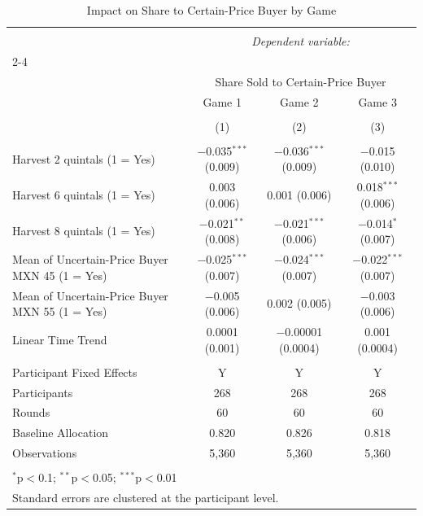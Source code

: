 
\begin{table}[!htbp] \centering 
  \caption{Impact on Share to Certain-Price Buyer by Game} 
  \label{round_level_outcomes_by_game} 
\begin{tabular}{@{\extracolsep{5pt}}lccc} 
\\[-1.8ex]\hline 
\hline \\[-1.8ex] 
 & \multicolumn{3}{c}{\textit{Dependent variable:}} \\ 
\cline{2-4} 
\\[-1.8ex] & \multicolumn{3}{c}{Share Sold to Certain-Price Buyer} \\ 
 & Game 1 & Game 2 & Game 3 \\ 
\\[-1.8ex] & (1) & (2) & (3)\\ 
\hline \\[-1.8ex] 
 Harvest 2 quintals (1 = Yes) & $-$0.035$^{***}$ (0.009) & $-$0.036$^{***}$ (0.009) & $-$0.015 (0.010) \\ 
  Harvest 6 quintals (1 = Yes) & 0.003 (0.006) & 0.001 (0.006) & 0.018$^{***}$ (0.006) \\ 
  Harvest 8 quintals (1 = Yes) & $-$0.021$^{**}$ (0.008) & $-$0.021$^{***}$ (0.006) & $-$0.014$^{*}$ (0.007) \\ 
  Mean of Uncertain-Price Buyer MXN 45 (1 = Yes) & $-$0.025$^{***}$ (0.007) & $-$0.024$^{***}$ (0.007) & $-$0.022$^{***}$ (0.007) \\ 
  Mean of Uncertain-Price Buyer MXN 55 (1 = Yes) & $-$0.005 (0.006) & 0.002 (0.005) & $-$0.003 (0.006) \\ 
  Linear Time Trend & 0.0001 (0.001) & $-$0.00001 (0.0004) & 0.001 (0.0004) \\ 
 \hline \\[-1.8ex] 
Participant Fixed Effects & Y & Y & Y \\ 
Participants & 268 & 268 & 268 \\ 
Rounds & 60 & 60 & 60 \\ 
Baseline Allocation & 0.820 & 0.826 & 0.818 \\ 
Observations & 5,360 & 5,360 & 5,360 \\ 
\hline 
\hline \\[-1.8ex] 
\multicolumn{4}{l}{$^{*}$p$<$0.1; $^{**}$p$<$0.05; $^{***}$p$<$0.01} \\ 
\multicolumn{4}{l}{Standard errors are clustered at the participant level.} \\ 

\end{tabular}
\end{table}
